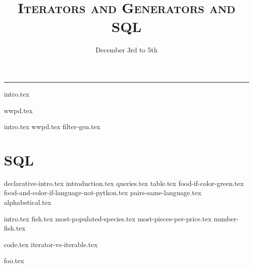 \documentclass{exam}
\title{\textsc{Iterators and Generators and SQL}}
\date{December 3rd to 5th}
\begin{document}
\maketitle
\rule{\textwidth}{0.15em}
\fontsize{12}{15}\selectfont

{intro.tex}
\begin{questions}
{wwpd.tex}

\newpage

{intro.tex}
\newpage
{wwpd.tex}
{filter-gen.tex}
\newpage
\section{SQL}
{declarative-intro.tex}
{introduction.tex}
{queries.tex}
\newpage
{table.tex}
{food-if-color-green.tex}
{food-and-color-if-language-not-python.tex}
{pairs-same-language.tex}
{alphabetical.tex}

\newpage
{intro.tex}
{fish.tex}
{most-populated-species.tex}
{most-pieces-per-price.tex}
{number-fish.tex}

\newpage
{code.tex}
{iterator-vs-iterable.tex}

\newpage
{foo.tex}
\end{questions}
\end{document}
